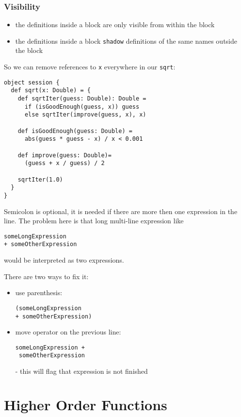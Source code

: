 \documentclass{scrartcl}
\newcommand{\term}[1]{\verb~#1~} %
\begin{document}
\subsubsection{Visibility}
\label{sec:visibility}

\begin{itemize}
\item the definitions inside a block are only visible from within the block
\item the definitions inside a block \term{shadow} definitions of the same names
  outside the block
\end{itemize}
So we can remove references to \lstinline|x| everywhere in our \lstinline|sqrt|:
\begin{lstlisting}
object session {
  def sqrt(x: Double) = {
    def sqrtIter(guess: Double): Double =
      if (isGoodEnough(guess, x)) guess
      else sqrtIter(improve(guess, x), x)

    def isGoodEnough(guess: Double) = 
      abs(guess * guess - x) / x < 0.001

    def improve(guess: Double)=
      (guess + x / guess) / 2

    sqrtIter(1.0)
  }
}
\end{lstlisting}

Semicolon is optional, it is needed if there are more then one expression in the
line. The problem here is that long multi-line expression like
\begin{lstlisting}
someLongExpression
+ someOtherExpression
\end{lstlisting}
would be interpreted as two expressions.

There are two ways to fix it:
\begin{itemize}
\item use parenthesis:
\begin{lstlisting}
(someLongExpression
+ someOtherExpression)
\end{lstlisting}
\item move operator on the previous line:
\begin{lstlisting}
someLongExpression +
 someOtherExpression
\end{lstlisting}
  - this will flag that expression is not finished
\end{itemize}

\section{Higher Order Functions}
\label{sec:Lection2-HigherOrderFunctions}
\end{document}
